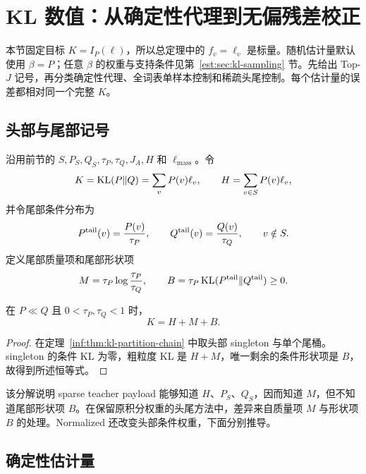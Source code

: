 \section{KL 数值：从确定性代理到无偏残差校正}
\label{est:sec:kl-scalar}
本节固定目标 $K=I_P(\ell)$，所以总定理中的 $f_v=\ell_v$ 是标量。随机估计量默认使用 $\beta=P$；任意 $\beta$ 的权重与支持条件见第~\ref{est:sec:kl-sampling} 节。先给出 Top-$J$ 记号，再分类确定性代理、全词表单样本控制和稀疏头尾控制。每个估计量的误差都相对同一个完整 $K$。
\subsection{头部与尾部记号}

沿用前节的 $S,P_S,Q_S,\tau_P,\tau_Q,J_A,H$ 和 $\ell_{\mathrm{mass}}$。令
\begin{equation*}
 K=\operatorname{KL}(P\Vert Q)=\sum_vP(v)\ell_v,
 \qquad H=\sum_{v\in S}P(v)\ell_v,
 \end{equation*}
并令尾部条件分布为
\begin{equation*}
 P^{\mathrm{tail}}(v)=\frac{P(v)}{\tau_P},\qquad
 Q^{\mathrm{tail}}(v)=\frac{Q(v)}{\tau_Q},\qquad v\notin S.
\end{equation*}
定义尾部质量项和尾部形状项
\begin{equation*}
 M=\tau_P\log\frac{\tau_P}{\tau_Q},\qquad
 B=\tau_P\operatorname{KL}(P^{\mathrm{tail}}\Vert Q^{\mathrm{tail}})\geq0.
\end{equation*}

\begin{corollary}
\label{est:thm:chapter3-kl-chain}
在 $P\ll Q$ 且 $0<\tau_P,\tau_Q<1$ 时，
\begin{equation}
 K=H+M+B.
\label{est:eq:chapter3-kl-chain}
\end{equation}
\end{corollary}

\begin{proof}
在定理~\ref{inf:thm:kl-partition-chain} 中取头部 singleton 与单个尾桶。singleton 的条件 KL 为零，粗粒度 KL 是 $H+M$，唯一剩余的条件形状项是 $B$，故得到所述恒等式。
\end{proof}

该分解说明 sparse teacher payload 能够知道 $H$、$P_S$、$Q_S$，因而知道 $M$，但不知道尾部形状项 $B$。在保留原积分权重的头尾方法中，差异来自质量项 $M$ 与形状项 $B$ 的处理。Normalized 还改变头部条件权重，下面分别推导。

\subsection{确定性估计量}

